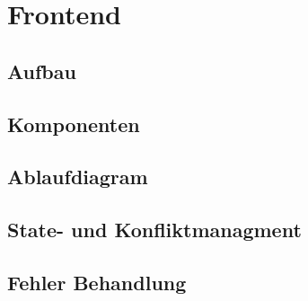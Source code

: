 \section{Frontend}


\subsection{Aufbau}

\subsection{Komponenten}


\subsection{Ablaufdiagram}


\subsection{State- und Konfliktmanagment}

\subsection{Fehler Behandlung}

